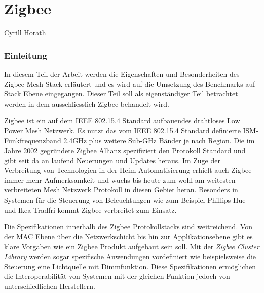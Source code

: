 \vspace*{4cm}
\part{Zigbee}\label{part:Zigbee}
Cyrill Horath
\vspace*{\fill}
\clearpage

\section{Einleitung}\label{sec:EinleitungZigbee}
In diesem Teil der Arbeit werden die Eigenschaften und Besonderheiten des Zigbee Mesh Stack erläutert und es wird auf die Umsetzung des Benchmarks auf Stack Ebene eingegangen. Dieser Teil soll als eigenständiger Teil betrachtet werden in dem ausschliesslich Zigbee behandelt wird.

Zigbee ist ein auf dem IEEE 802.15.4 Standard aufbauendes drahtloses Low Power Mesh Netzwerk. Es nutzt das vom IEEE 802.15.4 Standard definierte ISM-Funkfrequenzband 2.4GHz plus weitere Sub-GHz Bänder je nach Region.
Die im Jahre 2002 gegründete Zigbee Allianz spezifiziert den Protokoll Standard und gibt seit da an laufend Neuerungen und Updates heraus.
Im Zuge der Verbreitung von Technologien in der Heim Automatisierung erhielt auch Zigbee immer mehr Aufmerksamkeit und wuchs bis heute zum wohl am weitesten verbreiteten Mesh Netzwerk Protokoll in diesen Gebiet heran. Besonders in Systemen für die Steuerung von Beleuchtungen wie zum Beispiel Phillips Hue und Ikea Tradfri kommt Zigbee verbreitet zum Einsatz.

Die Spezifikationen innerhalb des Zigbee Protokollstacks sind weitreichend. Von der MAC Ebene über die Netzwerkschicht bis hin zur Applikationsebene gibt es klare Vorgaben wie ein Zigbee Produkt aufgebaut sein soll.
Mit der \textit{Zigbee Cluster Library} werden sogar spezifische Anwendungen vordefiniert wie beispielsweise die Steuerung eine Lichtquelle mit Dimmfunktion.
Diese Spezifikationen ermöglichen die Interoperabilität von Systemen mit der gleichen Funktion jedoch von unterschiedlichen Herstellern.





